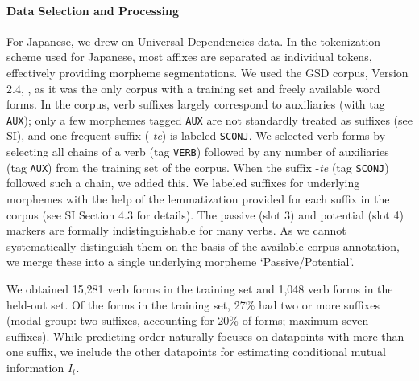 \paragraph{Data Selection and Processing}
For Japanese, we drew on Universal Dependencies data.
In the tokenization scheme used for Japanese, most affixes are separated as individual tokens, effectively providing morpheme segmentations.
We used the GSD corpus, Version 2.4, \citep{tanaka2016universal, asahara2018universal}, as it was the only corpus with a training set and freely available word forms.
In the corpus, verb suffixes largely correspond to auxiliaries (with tag \texttt{AUX}); only a few morphemes tagged \texttt{AUX} are not standardly treated as suffixes (see SI), and one frequent suffix (-\textit{te}) is labeled \texttt{SCONJ}.
We selected verb forms by selecting all chains of a verb (tag \texttt{VERB}) followed by any number of auxiliaries (tag \texttt{AUX}) from the training set of the corpus. When the suffix -\textit{te} (tag \texttt{SCONJ}) followed such a chain, we added this.
We labeled suffixes for underlying morphemes with the help of the lemmatization provided for each suffix in the corpus (see SI Section 4.3 for details).
The passive (slot 3) and potential (slot 4) markers are formally indistinguishable for many verbs.
As we cannot systematically distinguish them on the basis of the available corpus annotation, we merge these into a single underlying morpheme `Passive/Potential'.

We obtained 15,281 verb forms in the training set and 1,048 verb forms in the held-out set.
Of the forms in the training set, 27\% had two or more suffixes (modal group: two suffixes, accounting for 20\% of forms; maximum seven suffixes).
While predicting order naturally focuses on datapoints with more than one suffix, we include the other datapoints for estimating conditional mutual information $I_t$.


